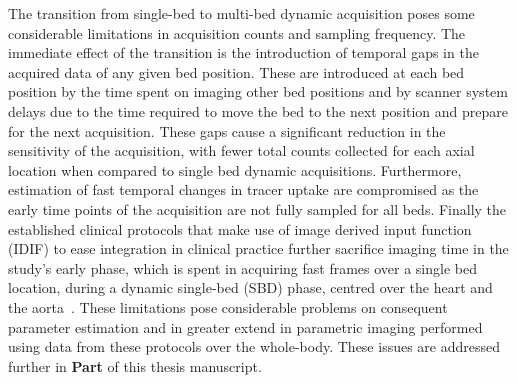 The transition from single-bed to multi-bed dynamic acquisition poses some considerable limitations in acquisition counts and sampling frequency. The immediate effect of the transition is the introduction of temporal gaps in the acquired data of any given bed position. These are introduced at each bed position by the time spent on imaging other bed positions and by scanner system delays due to the time required to move the bed to the next position and prepare for the next acquisition. These gaps cause a significant reduction in the sensitivity of the acquisition, with fewer total counts collected for each axial location when compared to single bed dynamic acquisitions. Furthermore, estimation of fast temporal changes in tracer uptake are compromised as the early time points of the acquisition are not fully sampled for all beds. Finally the established clinical protocols that make use of image derived input function (IDIF) to ease integration in clinical practice further sacrifice imaging time in the study’s early phase, which is spent in acquiring fast frames over a single bed location, during a dynamic single-bed (SBD) phase, centred over the heart and the aorta~\cite{Karakatsanis2013,Hu2020}.
These limitations pose considerable problems on consequent parameter estimation and in greater extend in parametric imaging performed using data from these protocols over the whole-body. These issues are addressed further in \textbf{Part } of this thesis manuscript.
%
%

